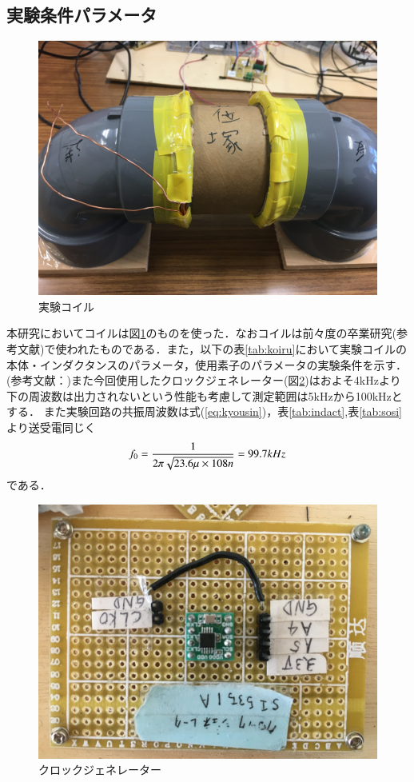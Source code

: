 \documentclass[12pt]{jarticle}
\begin{document}
\subsection{実験条件パラメータ}
 \begin{figure}[H]
	\centering
	\includegraphics[scale=0.1]{koiru.JPG}
	\caption{実験コイル}
	\label{fig:koiru}
\end{figure}
本研究においてコイルは図\ref{fig:koiru}のものを使った．なおコイルは前々度の卒業研究(参考文献\cite{goizuka})で使われたものである．また，以下の表\ref{tab:koiru}において実験コイルの本体・インダクタンスのパラメータ，使用素子のパラメータの実験条件を示す．(参考文献：\cite{goizuka})また今回使用したクロックジェネレーター(図\ref{fig:clk})はおよそ4kHzより下の周波数は出力されないという性能も考慮して測定範囲は5kHzから100kHzとする．
また実験回路の共振周波数は式(\ref{eq:kyousin})，表\ref{tab:indact},表\ref{tab:sosi}より送受電同じく
\begin{equation}
f_0=\frac{1}{2\pi\sqrt{23.6\mu \times 108n}} 
\\=99.7kHz
\label{eq:99.6k}
\end{equation}
である．
 \begin{figure}[H]
	\centering
	\includegraphics[scale=0.1,angle=180]{IMG_0737.JPG}
	\caption{クロックジェネレーター}
	\label{fig:clk}
\end{figure}
\end{document}
